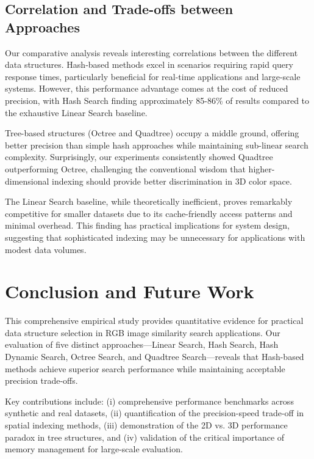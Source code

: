 \documentclass{sbc2023}
\begin{document}
\subsection{Correlation and Trade-offs between Approaches}

Our comparative analysis reveals interesting correlations between the different data structures. Hash-based methods excel in scenarios requiring rapid query response times, particularly beneficial for real-time applications and large-scale systems. However, this performance advantage comes at the cost of reduced precision, with Hash Search finding approximately 85-86\% of results compared to the exhaustive Linear Search baseline.

Tree-based structures (Octree and Quadtree) occupy a middle ground, offering better precision than simple hash approaches while maintaining sub-linear search complexity. Surprisingly, our experiments consistently showed Quadtree outperforming Octree, challenging the conventional wisdom that higher-dimensional indexing should provide better discrimination in 3D color space.

The Linear Search baseline, while theoretically inefficient, proves remarkably competitive for smaller datasets due to its cache-friendly access patterns and minimal overhead. This finding has practical implications for system design, suggesting that sophisticated indexing may be unnecessary for applications with modest data volumes.

\section{Conclusion and Future Work}
\label{sec:conclusion}

This comprehensive empirical study provides quantitative evidence for practical data structure selection in RGB image similarity search applications. Our evaluation of five distinct approaches—Linear Search, Hash Search, Hash Dynamic Search, Octree Search, and Quadtree Search—reveals that Hash-based methods achieve superior search performance while maintaining acceptable precision trade-offs.

Key contributions include: (i) comprehensive performance benchmarks across synthetic and real datasets, (ii) quantification of the precision-speed trade-off in spatial indexing methods, (iii) demonstration of the 2D vs. 3D performance paradox in tree structures, and (iv) validation of the critical importance of memory management for large-scale evaluation.
\end{document}
